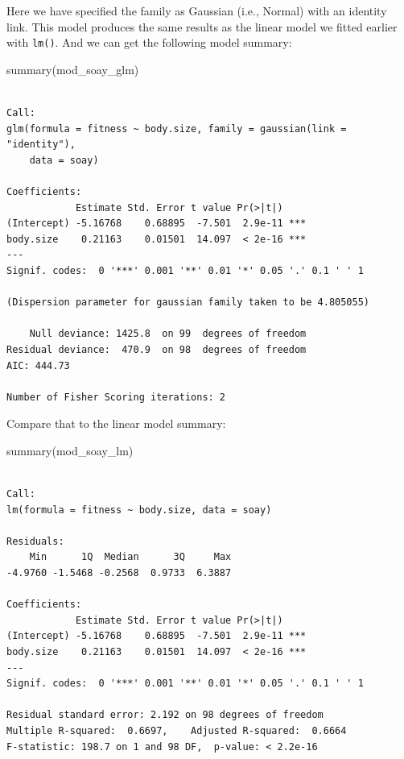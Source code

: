 \documentclass[
  letterpaper,
  8pt,
  a4paper]{book}
\newenvironment{Shaded}{\begin{snugshade}}{\end{snugshade}}
\newcommand{\FunctionTok}[1]{\textcolor[rgb]{0.28,0.35,0.67}{#1}}
\newcommand{\NormalTok}[1]{\textcolor[rgb]{0.00,0.23,0.31}{#1}}
\begin{document}
Here we have specified the family as Gaussian (i.e., Normal) with an
identity link. This model produces the same results as the linear model
we fitted earlier with \texttt{lm()}. And we can get the following model
summary:

\begin{Shaded}
\begin{Highlighting}[]
\FunctionTok{summary}\NormalTok{(mod\_soay\_glm)}
\end{Highlighting}
\end{Shaded}

\begin{verbatim}

Call:
glm(formula = fitness ~ body.size, family = gaussian(link = "identity"), 
    data = soay)

Coefficients:
            Estimate Std. Error t value Pr(>|t|)    
(Intercept) -5.16768    0.68895  -7.501  2.9e-11 ***
body.size    0.21163    0.01501  14.097  < 2e-16 ***
---
Signif. codes:  0 '***' 0.001 '**' 0.01 '*' 0.05 '.' 0.1 ' ' 1

(Dispersion parameter for gaussian family taken to be 4.805055)

    Null deviance: 1425.8  on 99  degrees of freedom
Residual deviance:  470.9  on 98  degrees of freedom
AIC: 444.73

Number of Fisher Scoring iterations: 2
\end{verbatim}

Compare that to the linear model summary:

\begin{Shaded}
\begin{Highlighting}[]
\FunctionTok{summary}\NormalTok{(mod\_soay\_lm)}
\end{Highlighting}
\end{Shaded}

\begin{verbatim}

Call:
lm(formula = fitness ~ body.size, data = soay)

Residuals:
    Min      1Q  Median      3Q     Max 
-4.9760 -1.5468 -0.2568  0.9733  6.3887 

Coefficients:
            Estimate Std. Error t value Pr(>|t|)    
(Intercept) -5.16768    0.68895  -7.501  2.9e-11 ***
body.size    0.21163    0.01501  14.097  < 2e-16 ***
---
Signif. codes:  0 '***' 0.001 '**' 0.01 '*' 0.05 '.' 0.1 ' ' 1

Residual standard error: 2.192 on 98 degrees of freedom
Multiple R-squared:  0.6697,    Adjusted R-squared:  0.6664 
F-statistic: 198.7 on 1 and 98 DF,  p-value: < 2.2e-16
\end{verbatim}
\end{document}
